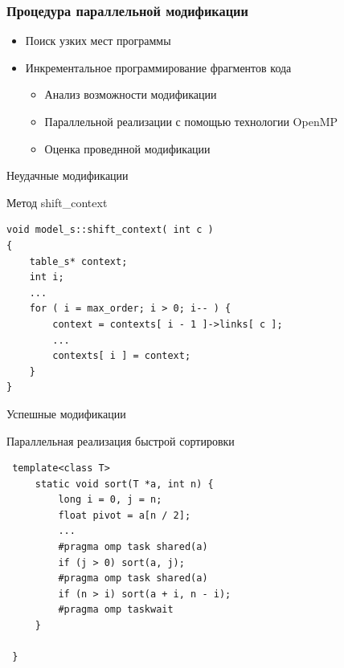 \documentclass{beamer}
\begin{document}
\begin{frame}\frametitle{Процедура параллельной модификации}
    \begin{itemize}
            \item{Поиск узких мест программы}
              \vspace{\baselineskip}
            \item{Инкрементальное программирование фрагментов кода
                \begin{itemize}
                    \item{Анализ возможности модификации}
                    \item{Параллельной реализации с помощью технологии OpenMP}
                    \item{Оценка проведнной модификации}
                \end{itemize}
            }
        \end{itemize}
\end{frame}


 \begin{frame}[fragile]{Неудачные модификации}
        \begin{block}{Метод shift\_context}
            \begin{lstlisting}
void model_s::shift_context( int c )
{
    table_s* context;
    int i;
    ...
    for ( i = max_order; i > 0; i-- ) {
        context = contexts[ i - 1 ]->links[ c ];
        ...
        contexts[ i ] = context;
    }
}
            \end{lstlisting}
        \end{block}
\end{frame}


 \begin{frame}[fragile]{Успешные модификации}
        \begin{block}{Параллельная реализация быстрой сортировки}
            \begin{lstlisting}
 template<class T>
     static void sort(T *a, int n) {
         long i = 0, j = n;
         float pivot = a[n / 2];
         ...
         #pragma omp task shared(a)
         if (j > 0) sort(a, j);
         #pragma omp task shared(a)
         if (n > i) sort(a + i, n - i);
         #pragma omp taskwait
     }

 }
            \end{lstlisting}
        \end{block}
\end{frame}
\end{document}
